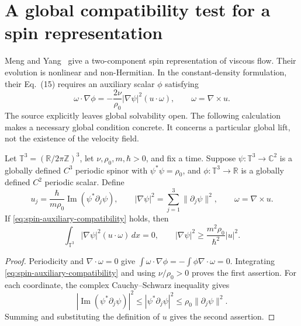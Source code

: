 \section{A global compatibility test for a spin representation}
\label{sec:quantum-spin-scope}

Meng and Yang~\cite{NSMengYang2024} give a two-component spin representation of viscous flow. Their evolution is nonlinear and non-Hermitian. In the constant-density formulation, their Eq.~(15) requires an auxiliary scalar $\phi$ satisfying
\begin{equation}
 \omega\cdot\nabla\phi
 =-\frac{2\nu}{\rho_0}|\nabla\psi|^2(u\cdot\omega),
 \qquad \omega=\nabla\times u.
 \label{eq:spin-auxiliary-compatibility}
\end{equation}
The source explicitly leaves global solvability open. The following calculation makes a necessary global condition concrete. It concerns a particular global lift, not the existence of the velocity field.

\begin{proposition}
\label{prop:spin-periodic-compatibility}
Let $\mathbb T^3=(\mathbb R/2\pi\mathbb Z)^3$, let $\nu,\rho_0,m,\hbar>0$, and fix a time. Suppose $\psi:\mathbb T^3\to\mathbb C^2$ is a globally defined $C^3$ periodic spinor with $\psi^*\psi=\rho_0$, and $\phi:\mathbb T^3\to\mathbb R$ is a globally defined $C^2$ periodic scalar. Define
\[
 u_j=\frac{\hbar}{m\rho_0}\operatorname{Im}(\psi^*\partial_j\psi),
 \qquad |\nabla\psi|^2=\sum_{j=1}^3\|\partial_j\psi\|^2,
 \qquad \omega=\nabla\times u.
\]
If \eqref{eq:spin-auxiliary-compatibility} holds, then
\[
 \int_{\mathbb T^3}|\nabla\psi|^2(u\cdot\omega)\,dx=0,
 \qquad
 |\nabla\psi|^2\geq\frac{m^2\rho_0}{\hbar^2}|u|^2.
\]
\end{proposition}
\begin{proof}
Periodicity and $\nabla\cdot\omega=0$ give
$\int\omega\cdot\nabla\phi=-\int\phi\nabla\cdot\omega=0$.
Integrating \eqref{eq:spin-auxiliary-compatibility} and using $\nu/\rho_0>0$ proves the first assertion. For each coordinate, the complex Cauchy--Schwarz inequality gives
\[
 |\operatorname{Im}(\psi^*\partial_j\psi)|^2
 \leq |\psi^*\partial_j\psi|^2
 \leq\rho_0\|\partial_j\psi\|^2.
\]
Summing and substituting the definition of $u$ gives the second assertion.
\end{proof}

